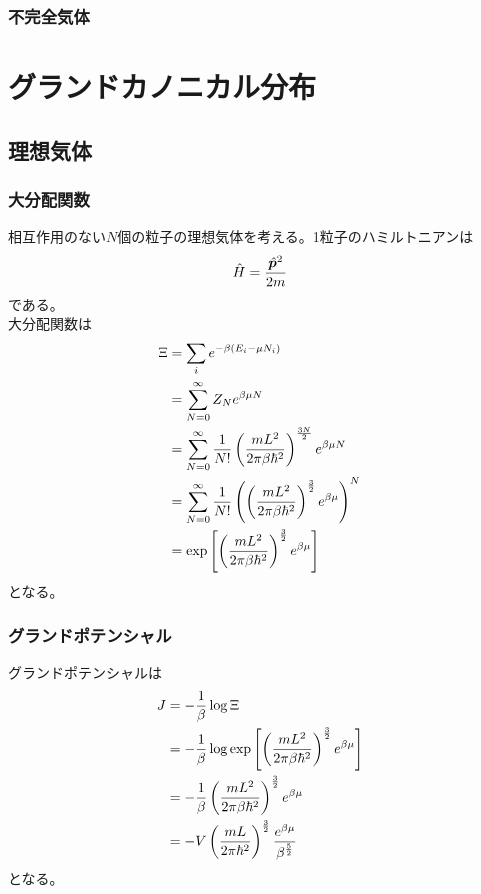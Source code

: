 \documentclass{jsarticle}  %
\numberwithin{equation}{section} %
\numberwithin{figure}{section}
\begin{document}
\subsubsection{不完全気体}
\section{グランドカノニカル分布}
\subsection{理想気体}
\subsubsection{大分配関数}
    相互作用のない$N$個の粒子の理想気体を考える。1粒子のハミルトニアンは
    \begin{align}
        \hat{H} = \frac{\hat{\bm{p}}^2}{2m} \notag
    \end{align}
    である。\\
    大分配関数は
    \begin{align}
        \Xi &= \sum_i e^{-\beta (E_i - \mu N_i)} \notag \\
        &= \sum_{N = 0}^{\infty} Z_{N} e^{\beta \mu N} \notag \\
        &= \sum_{N=0}^{\infty} \frac{1}{N!} \left( \frac{mL^2}{2\pi \beta \hbar^2 } \right)^{\frac{3N}{2}} e^{\beta \mu N} \notag \\
        &= \sum_{N=0}^{\infty} \frac{1}{N!} \left( \left( \frac{mL^2}{2\pi \beta \hbar^2 } \right)^{\frac{3}{2}} e^{\beta \mu} \right)^N \notag \\
        &= \exp \left[ \left( \frac{mL^2}{2\pi \beta \hbar^2 } \right)^{\frac{3}{2}} e^{\beta \mu} \right]
    \end{align}
    となる。
\subsubsection{グランドポテンシャル}
    グランドポテンシャルは
    \begin{align}
        J &= -\frac{1}{\beta} \log \Xi \notag \\
        &= -\frac{1}{\beta} \log  \exp \left[ \left( \frac{mL^2}{2\pi \beta \hbar^2 } \right)^{\frac{3}{2}} e^{\beta \mu} \right] \notag \\
        &= - \frac{1}{\beta} \left( \frac{mL^2}{2\pi \beta \hbar^2 } \right)^{\frac{3}{2}} e^{\beta \mu} \notag \\ 
        &= -V \left( \frac{mL}{2\pi \hbar^2 } \right)^{\frac{3}{2}} \frac{e^{\beta \mu}}{\beta^{\frac{5}{2}}}
    \end{align}
    となる。
\end{document}

